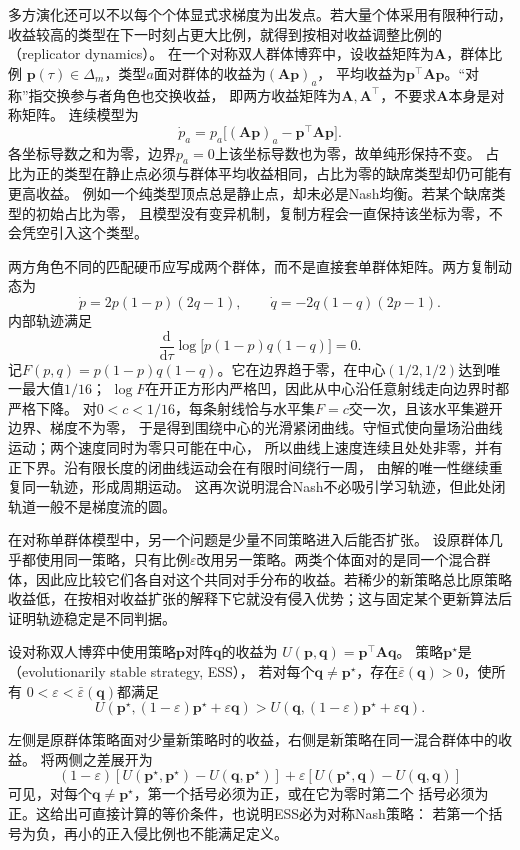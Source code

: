 多方演化还可以不以每个个体显式求梯度为出发点。若大量个体采用有限种行动，
收益较高的类型在下一时刻占更大比例，就得到按相对收益调整比例的
（replicator dynamics）。
在一个对称双人群体博弈中，设收益矩阵为\(\bm A\)，群体比例
\(\bm p(\tau)\in\Delta_m\)，类型\(a\)面对群体的收益为\((\bm A\bm p)_a\)，
平均收益为\(\bm p^\top\bm A\bm p\)。“对称”指交换参与者角色也交换收益，
即两方收益矩阵为\(\bm A,\bm A^\top\)，不要求\(\bm A\)本身是对称矩阵。
连续模型为
\begin{equation}
  \dot p_a
  =p_a\bigl[(\bm A\bm p)_a-\bm p^\top\bm A\bm p\bigr].
  \label{eq:game-replicator}
\end{equation}
各坐标导数之和为零，边界\(p_a=0\)上该坐标导数也为零，故单纯形保持不变。
占比为正的类型在静止点必须与群体平均收益相同，占比为零的缺席类型却仍可能有更高收益。
例如一个纯类型顶点总是静止点，却未必是Nash均衡。若某个缺席类型的初始占比为零，
且模型没有变异机制，复制方程会一直保持该坐标为零，不会凭空引入这个类型。

两方角色不同的匹配硬币应写成两个群体，而不是直接套单群体矩阵。两方复制动态为
\[
  \dot p=2p(1-p)(2q-1),\qquad
  \dot q=-2q(1-q)(2p-1).
\]
内部轨迹满足
\[
  \frac{\mathrm d}{\mathrm d\tau}
  \log\!\bigl[p(1-p)q(1-q)\bigr]=0.
\]
记$F(p,q)=p(1-p)q(1-q)$。它在边界趋于零，在中心$(1/2,1/2)$达到唯一最大值$1/16$；
$\log F$在开正方形内严格凹，因此从中心沿任意射线走向边界时都严格下降。
对$0<c<1/16$，每条射线恰与水平集$F=c$交一次，且该水平集避开边界、梯度不为零，
于是得到围绕中心的光滑紧闭曲线。守恒式使向量场沿曲线运动；两个速度同时为零只可能在中心，
所以曲线上速度连续且处处非零，并有正下界。沿有限长度的闭曲线运动会在有限时间绕行一周，
由解的唯一性继续重复同一轨迹，形成周期运动。
这再次说明混合Nash不必吸引学习轨迹，但此处闭轨道一般不是梯度流的圆。

在对称单群体模型中，另一个问题是少量不同策略进入后能否扩张。
设原群体几乎都使用同一策略，只有比例\(\varepsilon\)改用另一策略。两类个体面对的是同一个混合群体，因此应比较它们各自对这个共同对手分布的收益。若稀少的新策略总比原策略收益低，在按相对收益扩张的解释下它就没有侵入优势；这与固定某个更新算法后证明轨迹稳定是不同判据。
\begin{definition}[演化稳定策略]
\label{def:game-evolutionarily-stable}
设对称双人博弈中使用策略\(\bm p\)对阵\(\bm q\)的收益为
\(U(\bm p,\bm q)=\bm p^\top\bm A\bm q\)。
策略\(\bm p^\star\)是（evolutionarily stable strategy, ESS），
若对每个\(\bm q\ne\bm p^\star\)，存在\(\bar\varepsilon(\bm q)>0\)，使所有
\(0<\varepsilon<\bar\varepsilon(\bm q)\)都满足
\[
  U(\bm p^\star,(1-\varepsilon)\bm p^\star+\varepsilon\bm q)
  >
  U(\bm q,(1-\varepsilon)\bm p^\star+\varepsilon\bm q).
\]
\end{definition}
左侧是原群体策略面对少量新策略时的收益，右侧是新策略在同一混合群体中的收益。
将两侧之差展开为
\[
  (1-\varepsilon)
  [U(\bm p^\star,\bm p^\star)-U(\bm q,\bm p^\star)]
  +\varepsilon[U(\bm p^\star,\bm q)-U(\bm q,\bm q)]
\]
可见，对每个\(\bm q\ne\bm p^\star\)，第一个括号必须为正，或在它为零时第二个
括号必须为正。这给出可直接计算的等价条件，也说明ESS必为对称Nash策略：
若第一个括号为负，再小的正入侵比例也不能满足定义。

